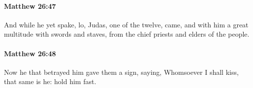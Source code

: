 		\paragraph{Matthew 26:47} %
			\label{MATTHEW-26-47}

			And while he yet spake, lo, Judas, one of the twelve, came, and with him a great multitude with swords and staves, from the chief priests and elders of the people.

			\begin{framed}
			\scriptsize
				\begin{compactdesc}
					\item[SBLG] 
				\end{compactdesc}
			\end{framed}

		\paragraph{Matthew 26:48} %
			\label{MATTHEW-26-48}

			Now he that betrayed him gave them a sign, saying, Whomsoever I shall kiss, that same is he: hold him fast.

